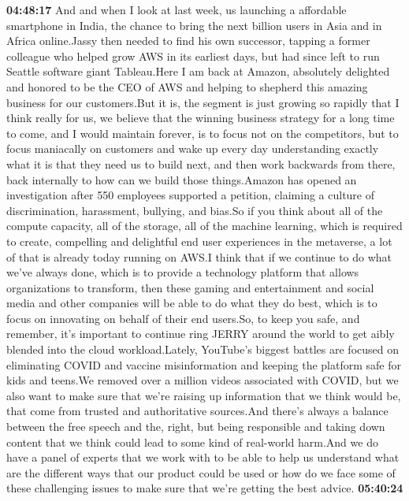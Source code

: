 \documentclass{article}%
\begin{document}
\textbf{04:48:17}%
\newline%
And and when I look at last week, us launching a affordable smartphone in India, the chance to bring the next billion users in Asia and in Africa online.Jassy then needed to find his own successor, tapping a former colleague who helped grow AWS in its earliest days, but had since left to run Seattle software giant Tableau.Here I am back at Amazon, absolutely delighted and honored to be the CEO of AWS and helping to shepherd this amazing business for our customers.But it is, the segment is just growing so rapidly that I think really for us, we believe that the winning business strategy for a long time to come, and I would maintain forever, is to focus not on the competitors, but to focus maniacally on customers and wake up every day understanding exactly what it is that they need us to build next, and then work backwards from there, back internally to how can we build those things.Amazon has opened an investigation after 550 employees supported a petition, claiming a culture of discrimination, harassment, bullying, and bias.So if you think about all of the compute capacity, all of the storage, all of the machine learning, which is required to create, compelling and delightful end user experiences in the metaverse, a lot of that is already today running on AWS.I think that if we continue to do what we've always done, which is to provide a technology platform that allows organizations to transform, then these gaming and entertainment and social media and other companies will be able to do what they do best, which is to focus on innovating on behalf of their end users.So, to keep you safe, and remember, it's important to continue ring JERRY around the world to get aibly blended into the cloud workload.Lately, YouTube's biggest battles are focused on eliminating COVID and vaccine misinformation and keeping the platform safe for kids and teens.We removed over a million videos associated with COVID, but we also want to make sure that we're raising up information that we think would be, that come from trusted and authoritative sources.And there's always a balance between the free speech and the, right, but being responsible and taking down content that we think could lead to some kind of real{-}world harm.And we do have a panel of experts that we work with to be able to help us understand what are the different ways that our product could be used or how do we face some of these challenging issues to make sure that we're getting the best advice.%
\textbf{05:40:24}%
\newline%
\end{document}
